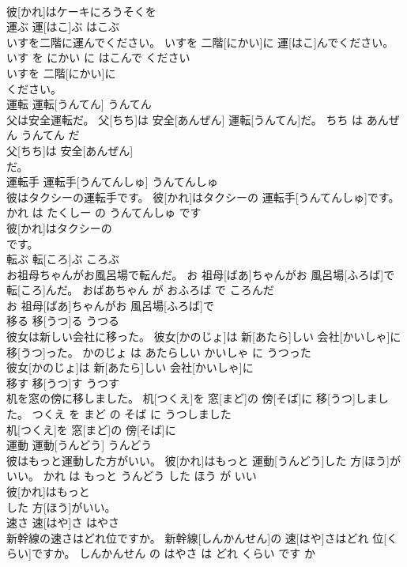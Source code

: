 \documentclass[8pt]{extreport}
\begin{document}
\begin{CJK}{UTF8}{min}
\\	彼[かれ]はケーキにろうそくを
\\	運ぶ	運[はこ]ぶ	はこぶ	
\\	いすを二階に運んでください。	いすを 二階[にかい]に 運[はこ]んでください。	いす を にかい に はこんで ください	
\\	いすを 二階[にかい]に
\\	ください。			
\\	運転	運転[うんてん]	うんてん	
\\	父は安全運転だ。	父[ちち]は 安全[あんぜん] 運転[うんてん]だ。	ちち は あんぜん うんてん だ	
\\	父[ちち]は 安全[あんぜん]
\\	だ。			
\\	運転手	運転手[うんてんしゅ]	うんてんしゅ	
\\	彼はタクシーの運転手です。	彼[かれ]はタクシーの 運転手[うんてんしゅ]です。	かれ は たくしー の うんてんしゅ です	
\\	彼[かれ]はタクシーの
\\	です。			
\\	転ぶ	転[ころ]ぶ	ころぶ	
\\	お祖母ちゃんがお風呂場で転んだ。	お 祖母[ばあ]ちゃんがお 風呂場[ふろば]で 転[ころ]んだ。	おばあちゃん が おふろば で ころんだ	
\\	お 祖母[ばあ]ちゃんがお 風呂場[ふろば]で
\\	移る	移[うつ]る	うつる	
\\	彼女は新しい会社に移った。	彼女[かのじょ]は 新[あたら]しい 会社[かいしゃ]に 移[うつ]った。	かのじょ は あたらしい かいしゃ に うつった	
\\	彼女[かのじょ]は 新[あたら]しい 会社[かいしゃ]に
\\	移す	移[うつ]す	うつす	
\\	机を窓の傍に移しました。	机[つくえ]を 窓[まど]の 傍[そば]に 移[うつ]しました。	つくえ を まど の そば に うつしました	
\\	机[つくえ]を 窓[まど]の 傍[そば]に
\\	運動	運動[うんどう]	うんどう	
\\	彼はもっと運動した方がいい。	彼[かれ]はもっと 運動[うんどう]した 方[ほう]がいい。	かれ は もっと うんどう した ほう が いい	
\\	彼[かれ]はもっと
\\	した 方[ほう]がいい。			
\\	速さ	速[はや]さ	はやさ	
\\	新幹線の速さはどれ位ですか。	新幹線[しんかんせん]の 速[はや]さはどれ 位[くらい]ですか。	しんかんせん の はやさ は どれ くらい です か	

\end{CJK}
\end{document}
